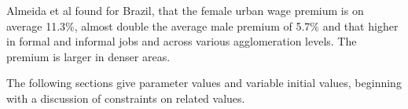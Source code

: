 Almeida et al \cite{almeidaUrbanWagePremium2022} found for Brazil, that the female urban wage premium is on average 11.3\%, almost double the average male premium of 5.7\% and that higher in formal and informal jobs and across various agglomeration levels. The premium is larger in denser areas.

















The following sections give parameter values and variable initial values, beginning with a discussion of constraints on related values. %


